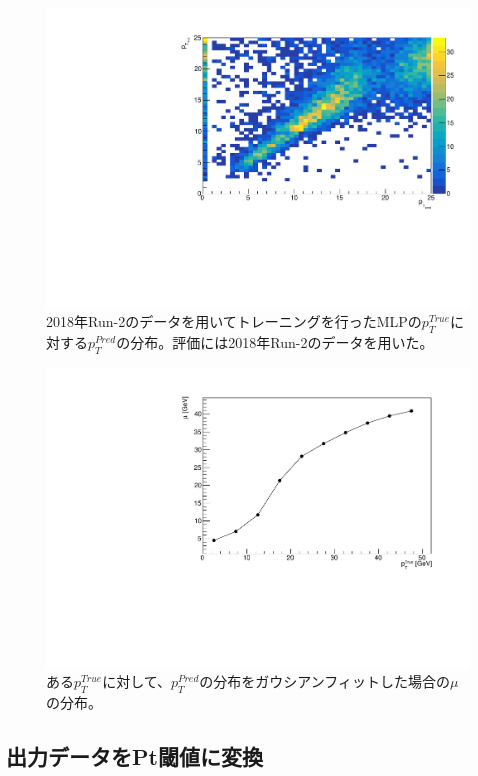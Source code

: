 \begin{figure}[tb]
  \centering
  \includegraphics[clip, width=12cm]{fig/4/zansa_25_DESDM.pdf}
  \caption{2018年Run-2のデータを用いてトレーニングを行ったMLPの$p_{T}^{True}$に対する$p_{T}^{Pred}$の分布。評価には2018年Run-2のデータを用いた。}
  \label{fig:zannsa_25_Data}
\end{figure}


\begin{figure}[tb]
  \centering
  \includegraphics[clip, width=12cm]{fig/4/tp_Gausmean_Data.pdf}
  \caption{ある$p_T^{True}$に対して、$p_T^{Pred}$の分布をガウシアンフィットした場合の$\mu$の分布。}
  \label{fig:Gausmu_Data}
\end{figure}

\subsection{出力データをPt閾値に変換}
